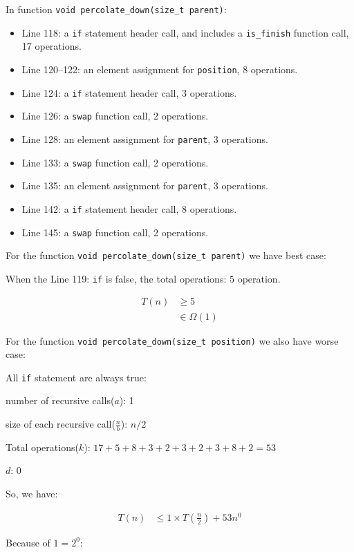 \documentclass[11pt]{article}
\begin{document}
In function \texttt{void percolate\_down(size\_t parent)}:
\begin{itemize}
    \item Line 118: a \texttt{if} statement header call, 
                    and includes a \texttt{is\_finish} function call, 17 operations. 
    \item Line 120--122: an element assignment for \texttt{position}, 
                           8 operations.
    \item Line 124: a \texttt{if} statement header call, 3 operations.
    \item Line 126: a \texttt{swap} function call, 2 operations.
    \item Line 128: an element assignment for \texttt{parent}, 3 operations.
    \item Line 133: a \texttt{swap} function call, 2 operations.
    \item Line 135: an element assignment for \texttt{parent}, 3 operations.
    \item Line 142: a \texttt{if} statement header call, 8 operations.
    \item Line 145: a \texttt{swap} function call, 2 operations.
\end{itemize}

For the function \texttt{void percolate\_down(size\_t parent)} we have best case:

When the Line 119: \texttt{if} is false, the total operations: $5$ operation.

\begin{align*}
    T(n) &\geq 5 \\
         &\in \Omega(1)
\end{align*}

For the function \texttt{void percolate\_down(size\_t position)} we also have worse case:

All \texttt{if} statement are always true:

number of recursive calls($a$): 1

size of each recursive call($\frac{n}{b}$): $n/2$

Total operations($k$): $17 + 5 + 8 + 3 + 2 + 3 + 2 + 3 + 8 + 2= 53$

$d$: 0

So, we have:

\begin{align*}
    T(n) & \leq 1 \times T(\frac{n}{2}) + 53n^0
\end{align*}

Because of $1 = 2^0$:
\end{document}
